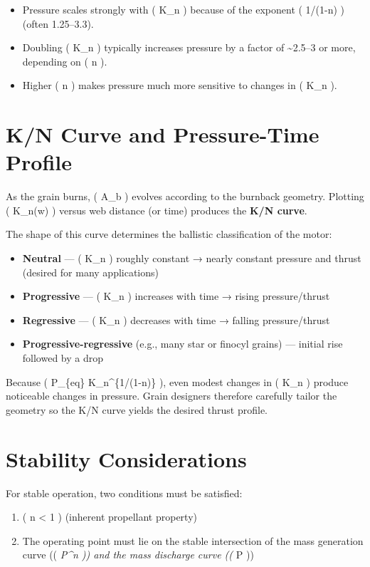 \documentclass[
  letterpaper,
  DIV=11,
  numbers=noendperiod]{scrreprt}
\providecommand{\tightlist}{%
  \setlength{\itemsep}{0pt}\setlength{\parskip}{0pt}}
\begin{document}
\begin{itemize}
\tightlist
\item
  Pressure scales strongly with ( K\_n ) because of the exponent (
  1/(1-n) ) (often 1.25--3.3).
\item
  Doubling ( K\_n ) typically increases pressure by a factor of
  \textasciitilde2.5--3 or more, depending on ( n ).
\item
  Higher ( n ) makes pressure much more sensitive to changes in ( K\_n
  ).
\end{itemize}

\section{K/N Curve and Pressure-Time
Profile}\label{kn-curve-and-pressure-time-profile}

As the grain burns, ( A\_b ) evolves according to the burnback geometry.
Plotting ( K\_n(w) ) versus web distance (or time) produces the
\textbf{K/N curve}.

The shape of this curve determines the ballistic classification of the
motor:

\begin{itemize}
\tightlist
\item
  \textbf{Neutral} --- ( K\_n ) roughly constant → nearly constant
  pressure and thrust (desired for many applications)
\item
  \textbf{Progressive} --- ( K\_n ) increases with time → rising
  pressure/thrust
\item
  \textbf{Regressive} --- ( K\_n ) decreases with time → falling
  pressure/thrust
\item
  \textbf{Progressive-regressive} (e.g., many star or finocyl grains)
  --- initial rise followed by a drop
\end{itemize}

Because ( P\_\{eq\} \propto K\_n\^{}\{1/(1-n)\} ), even modest changes
in ( K\_n ) produce noticeable changes in pressure. Grain designers
therefore carefully tailor the geometry so the K/N curve yields the
desired thrust profile.

\section{Stability Considerations}\label{stability-considerations}

For stable operation, two conditions must be satisfied:

\begin{enumerate}
\def\labelenumi{\arabic{enumi}.}
\tightlist
\item
  ( n \textless{} 1 ) (inherent propellant property)
\item
  The operating point must lie on the stable intersection of the mass
  generation curve (( \emph{ \propto P\^{}n )) and the
  mass discharge curve (( } \propto P ))
\end{enumerate}
\end{document}
